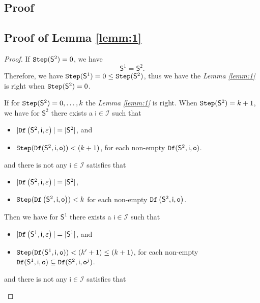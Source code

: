 \begin{appendices}
\section{Proof}
\label{sec:pro}
\subsection{Proof of Lemma \ref{lemm:1}}
\begin{proof}
If ${\tt Step}(\mathsf{S}^{2})=0$, we have  \[\mathsf{S}^{1} = \mathsf{S}^{2}.\] Therefore, we have ${\tt Step}(\mathsf{S}^{1})=0\le{\tt Step}(\mathsf{S}^{2})$, thus we have the {\em Lemma \ref{lemm:1}} is right when ${\tt Step}(\mathsf{S}^{2})=0$.
 
 If for ${\tt Step}(\mathsf{S}^{2})=0,\ldots, k$ the {\em Lemma \ref{lemm:1}} is right. When ${\tt Step}(\mathsf{S}^{2})=k+1$, we have for $\mathsf{S}^{2}$ there exists a $\mathsf{i}\in \mathcal{I}$ such that
 \begin{itemize}
 \item  $|{\tt Df}\left(\mathsf{S}^{2},\mathsf{i},\varepsilon\right)|=|\mathsf{S}^{2}|$, and 
 \item  ${\tt Step}({\tt Df}(\mathsf{S}^{2},\mathsf{i},\mathsf{o}))<(k+1)$, for each non-empty ${\tt Df}(\mathsf{S}^{2},\mathsf{i},\mathsf{o})$.
 \end{itemize}
 and there is not any $\mathsf{i} \in \mathcal{I}$ satisfies that
  \begin{itemize}
 \item  $|{\tt Df}\left(\mathsf{S}^{2},\mathsf{i},\varepsilon\right)|=|\mathsf{S}^2|$,
 \item  ${\tt Step}({\tt Df}\left(\mathsf{S}^{2},\mathsf{i},\mathsf{o}\right))< k$ for each non-empty ${\tt Df}\left(\mathsf{S}^{2},\mathsf{i},\mathsf{o}\right)$.
 \end{itemize} 
 Then we have for $\mathsf{S}^{1}$ there exists a $\mathsf{i}\in \mathcal{I}$ such that
 \begin{itemize}
 \item  $|{\tt Df}\left(\mathsf{S}^{1},\mathsf{i},\varepsilon\right)|=|\mathsf{S}^{1}|$, and 
 \item  ${\tt Step}({\tt Df}(\mathsf{S}^{1},\mathsf{i},\mathsf{o}))<(k'+1)\le (k+1)$, for each non-empty ${\tt Df}(\mathsf{S}^{1},\mathsf{i},\mathsf{o})\subseteq {\tt Df}(\mathsf{S}^{2},\mathsf{i},\mathsf{o}^{j})$.
 \end{itemize}
 and there is not any $\mathsf{i} \in \mathcal{I}$ satisfies that
  \begin{itemize}

\end{itemize}
\end{proof}
\end{appendices}
